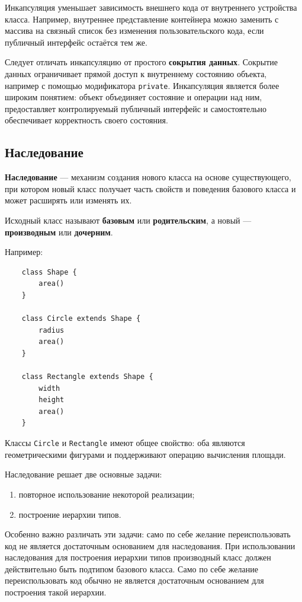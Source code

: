 Инкапсуляция уменьшает зависимость внешнего кода от внутреннего устройства класса. Например, внутреннее представление контейнера можно заменить с массива на связный список без изменения пользовательского кода, если публичный интерфейс остаётся тем же.

Следует отличать инкапсуляцию от простого \textbf{сокрытия данных}. Сокрытие данных ограничивает прямой доступ к внутреннему состоянию объекта, например с помощью модификатора \texttt{private}. Инкапсуляция является более широким понятием: объект объединяет состояние и операции над ним, предоставляет контролируемый публичный интерфейс и самостоятельно обеспечивает корректность своего состояния.

\subsection{Наследование}

\textbf{Наследование} --- механизм создания нового класса на основе существующего, при котором новый класс получает часть свойств и поведения базового класса и может расширять или изменять их.

Исходный класс называют \textbf{базовым} или \textbf{родительским}, а новый --- \textbf{производным} или \textbf{дочерним}.

Например:
\begin{verbatim}
	class Shape {
		area()
	}
	
	class Circle extends Shape {
		radius
		area()
	}
	
	class Rectangle extends Shape {
		width
		height
		area()
	}
\end{verbatim}

Классы \texttt{Circle} и \texttt{Rectangle} имеют общее свойство: оба являются геометрическими фигурами и поддерживают операцию вычисления площади.

Наследование решает две основные задачи:
\begin{enumerate}
	\item повторное использование некоторой реализации;
	\item построение иерархии типов.
\end{enumerate}

Особенно важно различать эти задачи: само по себе желание переиспользовать код не является достаточным основанием для наследования. При использовании наследования для построения иерархии типов производный класс должен действительно быть подтипом базового класса. Само по себе желание переиспользовать код обычно не является достаточным основанием для построения такой иерархии.

